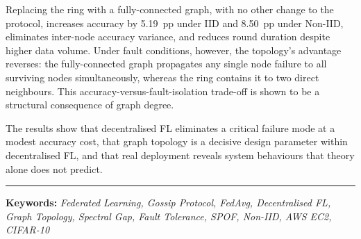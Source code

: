 \documentclass[12pt]{report}
\begin{document}
Replacing the ring with a fully-connected graph, with no other change to the
protocol, increases accuracy by 5.19~pp under IID and 8.50~pp under Non-IID,
eliminates inter-node accuracy variance, and reduces round duration despite
higher data volume. Under fault conditions, however, the topology's advantage
reverses: the fully-connected graph propagates any single node failure to all
surviving nodes simultaneously, whereas the ring contains it to two direct
neighbours. This accuracy-versus-fault-isolation trade-off is shown to be a
structural consequence of graph degree.

The results show that decentralised FL eliminates a critical failure mode at a
modest accuracy cost, that graph topology is a decisive design parameter within
decentralised FL, and that real deployment reveals system behaviours that
theory alone does not predict.

\vspace{0.5cm}
\noindent\rule{\textwidth}{0.4pt}
\vspace{0.3cm}
\noindent\textbf{Keywords:} \textit{Federated Learning, Gossip Protocol,
FedAvg, Decentralised FL, Graph Topology, Spectral Gap, Fault Tolerance,
SPOF, Non-IID, AWS EC2, CIFAR-10}

\newpage
\singlespacing
\tableofcontents

\newpage
\listoffigures

\newpage
\listoftables
\end{document}
